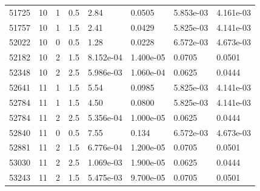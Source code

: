 \documentclass[preview]{standalone}
\begin{document}
{{{{{{{{{\begin{tabular}{L{1.2cm}C{1.2cm} C{0.3cm}C{0.5cm} C{1.4cm}C{1.4cm} C{1.4cm}C{1.4cm}}
  51725  &    10  & 1     & 0.5 &  2.84  & 0.0505  & 5.853e-03 &  4.161e-03   \\ 
  51757  &    10  & 1     & 1.5 &  2.41  & 0.0429  & 5.825e-03 &  4.141e-03   \\ 
  52022  &    10  & 0     & 0.5 &  1.28  & 0.0228  & 6.572e-03 &  4.673e-03   \\ 
  52182  &    10  & 2     & 1.5 &  8.152e-04  & 1.400e-05  & 0.0705 &  0.0501   \\ 
  52348  &    10  & 2     & 2.5 &  5.986e-03  & 1.060e-04  & 0.0625 &  0.0444   \\ 
  52641  &    11  & 1     & 1.5 &  5.54  & 0.0985  & 5.825e-03 &  4.141e-03   \\ 
  52784  &    11  & 1     & 1.5 &  4.50  & 0.0800  & 5.825e-03 &  4.141e-03   \\ 
  52784  &    11  & 2     & 2.5 &  5.356e-04  & 1.000e-05  & 0.0625 &  0.0444   \\ 
  52840  &    11  & 0     & 0.5 &  7.55  & 0.134  & 6.572e-03 &  4.673e-03   \\ 
  52881  &    11  & 2     & 1.5 &  6.776e-04  & 1.200e-05  & 0.0705 &  0.0501   \\ 
  53030  &    11  & 2     & 2.5 &  1.069e-03  & 1.900e-05  & 0.0625 &  0.0444   \\ 
  53243  &    11  & 2     & 1.5 &  5.475e-03  & 9.700e-05  & 0.0705 &  0.0501   \\ 
\hline 
\end{tabular} 

}}}}}}}}}
\end{document}
